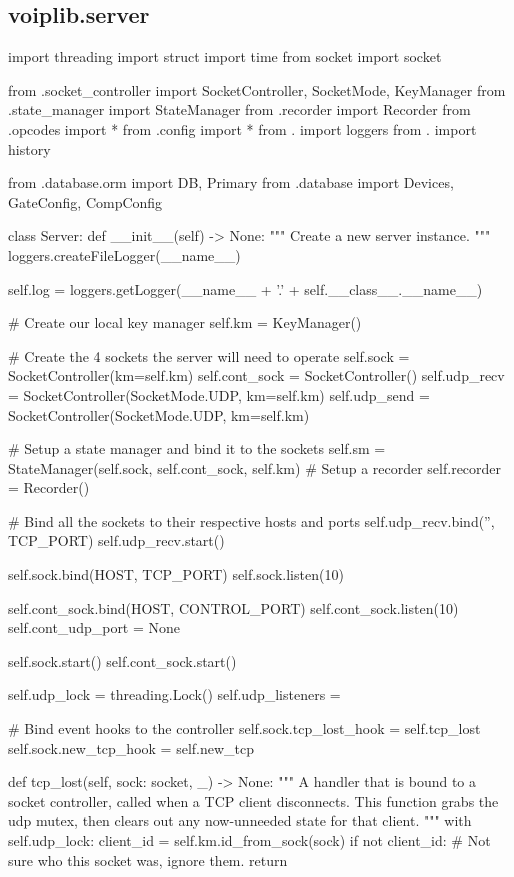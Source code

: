 \subsection{voiplib.server}
\begin{pythoncode}
import threading
import struct
import time
from socket import socket

from .socket_controller import SocketController, SocketMode, KeyManager
from .state_manager import StateManager
from .recorder import Recorder
from .opcodes import *
from .config import *
from . import loggers
from . import history


from .database.orm import DB, Primary
from .database import Devices, GateConfig, CompConfig


class Server:
    def __init__(self) -> None:
        """
        Create a new server instance.
        """
        loggers.createFileLogger(__name__)

        self.log = loggers.getLogger(__name__ + '.' + self.__class__.__name__)

        # Create our local key manager
        self.km = KeyManager()

        # Create the 4 sockets the server will need to operate
        self.sock = SocketController(km=self.km)
        self.cont_sock = SocketController()
        self.udp_recv = SocketController(SocketMode.UDP, km=self.km)
        self.udp_send = SocketController(SocketMode.UDP, km=self.km)

        # Setup a state manager and bind it to the sockets
        self.sm = StateManager(self.sock, self.cont_sock, self.km)
        # Setup a recorder
        self.recorder = Recorder()

        # Bind all the sockets to their respective hosts and ports
        self.udp_recv.bind('', TCP_PORT)
        self.udp_recv.start()

        self.sock.bind(HOST, TCP_PORT)
        self.sock.listen(10)

        self.cont_sock.bind(HOST, CONTROL_PORT)
        self.cont_sock.listen(10)
        self.cont_udp_port = None

        self.sock.start()
        self.cont_sock.start()

        self.udp_lock = threading.Lock()
        self.udp_listeners = {}

        # Bind event hooks to the controller
        self.sock.tcp_lost_hook = self.tcp_lost
        self.sock.new_tcp_hook = self.new_tcp

    def tcp_lost(self, sock: socket, _) -> None:
        """
        A handler that is bound to a socket controller, called when a TCP
        client disconnects. This function grabs the udp mutex, then clears out
        any now-unneeded state for that client.
        """
        with self.udp_lock:
            client_id = self.km.id_from_sock(sock)
            if not client_id:
                # Not sure who this socket was, ignore them.
                return


\end{pythoncode}
